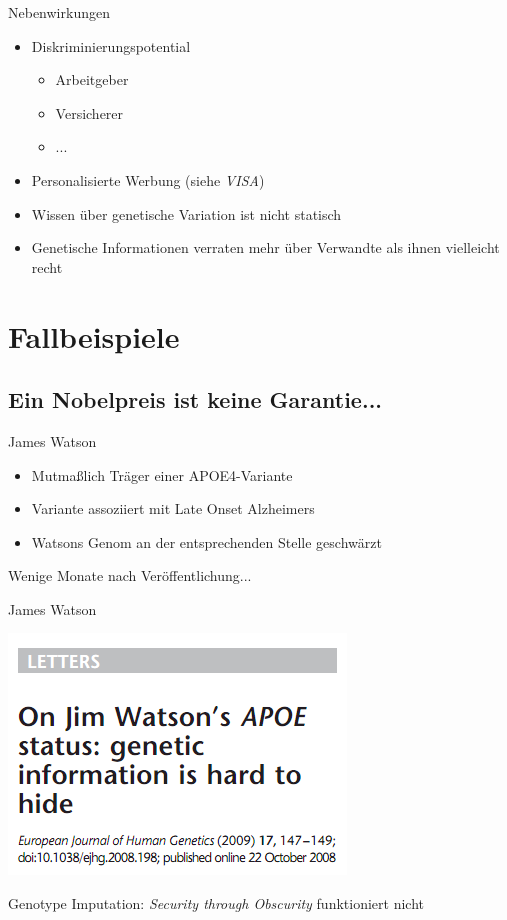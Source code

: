 \documentclass[12pt,a4paper]{beamer}
\begin{document}
\begin{frame}{Nebenwirkungen}
	\begin{itemize}
		\item Diskriminierungspotential
		\begin{itemize}
			\item Arbeitgeber
			\item Versicherer
			\item ...
		\end{itemize}
		\pause \item Personalisierte Werbung (siehe \emph{VISA})
		\pause \item Wissen über genetische Variation ist nicht statisch
		\pause \item Genetische Informationen verraten mehr über Verwandte als ihnen vielleicht recht
	\end{itemize}
\end{frame}

\section{Fallbeispiele}
\subsection{Ein Nobelpreis ist keine Garantie...}
\begin{frame}{James Watson}
	\begin{itemize}
		\item Mutmaßlich Träger einer APOE4-Variante
		\pause \item Variante assoziiert mit Late Onset Alzheimers
		\pause \item Watsons Genom an der entsprechenden Stelle geschwärzt
	\end{itemize}
	\begin{center}
		\pause Wenige Monate nach Veröffentlichung...
	\end{center}
\end{frame}

\begin{frame}{James Watson}
	\begin{center}
		\includegraphics[scale=0.5]{watson_paper.png}
	\end{center}
	\begin{center}
		Genotype Imputation: \emph{Security through Obscurity} funktioniert nicht
	\end{center}
\end{frame}
\end{document}
